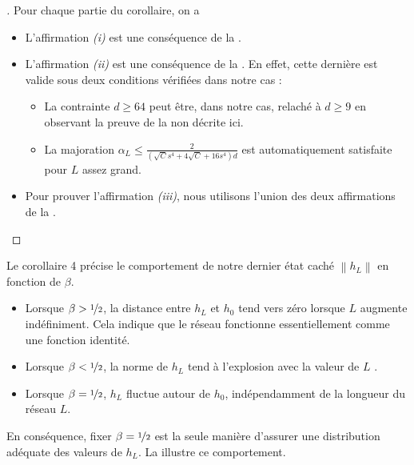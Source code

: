 \begin{proof}[]
    Pour chaque partie du corollaire, on a
    \begin{itemize}
        \item L'affirmation \textit{(i)} est une conséquence de la .
        \item L'affirmation \textit{(ii)} est une conséquence de la . En effet, cette dernière est valide sous deux conditions vérifiées dans notre cas : \begin{itemize}
            \item La contrainte $ d \geq 64 $ peut être, dans notre cas, relaché à $ d \geq 9 $ en observant la preuve de la  non décrite ici.
            \item La majoration $ \alpha _L \leq \frac{2}{(\sqrt{C} s^4 + 4 \sqrt{C} + 16s^4)d} $ est automatiquement satisfaite pour $ L $ assez grand.
        \end{itemize}
        \item Pour prouver l'affirmation \textit{(iii)}, nous utilisons l'union des deux affirmations de la .
    \end{itemize}
\end{proof}

Le corollaire 4 précise le comportement de notre dernier état caché $\left\| h_L \right\|$ en fonction de $\beta$.
\begin{itemize}
    \item Lorsque $\beta > \nicefrac{1}{2}$, la distance entre $h_L$ et $h_0$ tend vers zéro lorsque $L$ augmente indéfiniment. Cela indique que le réseau fonctionne essentiellement comme une fonction identité.
    \item Lorsque $\beta < \nicefrac{1}{2}$, la norme de $h_L$ tend à l'explosion avec la valeur de $ L $ .
    \item Lorsque $\beta = \nicefrac{1}{2}$, $h_L$ fluctue autour de $h_0$, indépendamment de la longueur du réseau $L$.
\end{itemize}
En conséquence, fixer $\beta = \nicefrac{1}{2}$ est la seule manière d'assurer une distribution adéquate des valeurs de $h_L$. La  illustre ce comportement.

